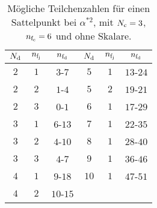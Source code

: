 \begin{table}[h]
\centering
 \begin{tabular}{ccc||ccc}
 \toprule \midrule
 $N_\text{d}$ 	& $n_{\text{f}_\text{j}}$ 	& $n_{\text{f}_\text{d}}$ 	 & $N_\text{d}$ 	& $n_{\text{f}_\text{j}}$ 	& $n_{\text{f}_\text{d}}$ 			 \\
 \midrule 
 $2$	& $1$		& $3$-$7$		& $5$		& $1$	& $13$-$24$	\\
 $2$	& $2$		& $1$-$4$		& $5$		& $2$	& $19$-$21$	\\
 $2$	& $3$		& $0$-$1$		& $6$		& $1$	& $17$-$29$	\\
 $3$	& $1$		& $6$-$13$		& $7$		& $1$	& $22$-$35$	\\
 $3$	& $2$		& $4$-$10$		& $8$		& $1$	& $28$-$40$	\\
 $3$	& $3$		& $4$-$7$		& $9$		& $1$	& $36$-$46$	\\
 $4$	& $1$		& $9$-$18$		& $10$		& $1$	& $47$-$51$	\\
 $4$	& $2$		& $10$-$15$		\\
 \midrule \bottomrule
 \end{tabular}
\caption{Mögliche Teilchenzahlen für einen Sattelpunkt bei $\alpha^{*2}$, mit $N_\text{c}=3$, $n_{\text{f}_\text{c}}=6$ und ohne Skalare.}
\label{tab:beta_QCDxdQCD:Fix3_ohne_Skalare}
\end{table}

